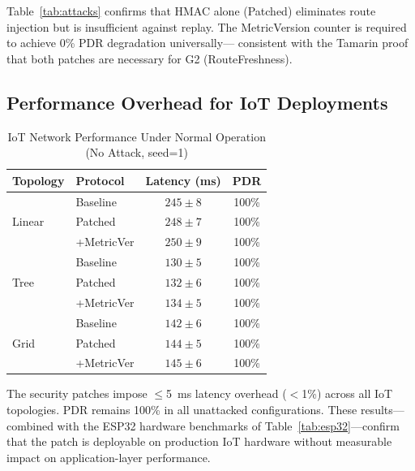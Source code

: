 \documentclass[10pt,journal,compsoc]{IEEEtran}
\begin{document}
Table~\ref{tab:attacks} confirms that HMAC alone (Patched) eliminates
route injection but is insufficient against replay. The MetricVersion
counter is required to achieve 0\% PDR degradation universally—
consistent with the Tamarin proof that both patches are necessary
for G2 (RouteFreshness).

\subsection{Performance Overhead for IoT Deployments}

\begin{table}[t]
  \centering
  \caption{IoT Network Performance Under Normal Operation (No Attack, seed=1)}
  \label{tab:overhead}
  \begin{tabular}{llcc}
    \toprule
    \textbf{Topology} & \textbf{Protocol} & \textbf{Latency (ms)} & \textbf{PDR} \\
    \midrule
    \multirow{3}{*}{Linear}
      & Baseline      & $245 \pm 8$  & 100\% \\
      & Patched       & $248 \pm 7$  & 100\% \\
      & +MetricVer    & $250 \pm 9$  & 100\% \\
    \midrule
    \multirow{3}{*}{Tree}
      & Baseline      & $130 \pm 5$  & 100\% \\
      & Patched       & $132 \pm 6$  & 100\% \\
      & +MetricVer    & $134 \pm 5$  & 100\% \\
    \midrule
    \multirow{3}{*}{Grid}
      & Baseline      & $142 \pm 6$  & 100\% \\
      & Patched       & $144 \pm 5$  & 100\% \\
      & +MetricVer    & $145 \pm 6$  & 100\% \\
    \bottomrule
  \end{tabular}
\end{table}

The security patches impose $\leq$5~ms latency overhead ($<$1\%)
across all IoT topologies. PDR remains 100\% in all unattacked
configurations. These results—combined with the ESP32 hardware
benchmarks of Table~\ref{tab:esp32}—confirm that the patch is
deployable on production IoT hardware without measurable impact on
application-layer performance.
\end{document}
